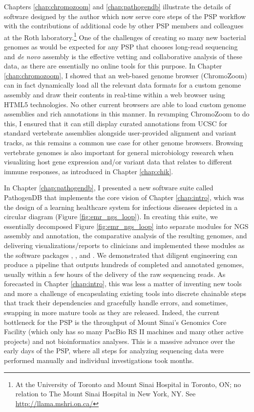 Chapters \ref{chap:chromozoom} and \ref{chap:pathogendb} illustrate the details of software designed by the author which now serve core steps of the PSP workflow with the contributions of additional code by other PSP members and colleagues at the Roth laboratory.\footnote{At the University of Toronto and Mount Sinai Hospital in Toronto, ON; no relation to The Mount Sinai Hospital in New York, NY. See \url{http://llama.mshri.on.ca/}} One of the challenges of creating so many new bacterial genomes as would be expected for any PSP that chooses long-read sequencing and \emph{de novo} assembly is the effective vetting and collaborative analysis of these data, as there are essentially no online tools for this purpose. In Chapter \ref{chap:chromozoom}, I showed that an web-based genome browser (ChromoZoom) can in fact dynamically load all the relevant data formats for a custom genome assembly and draw their contents in real-time within a web browser using HTML5 technologies. No other current browsers are able to load custom genome assemblies and rich annotations in this manner. In revamping ChromoZoom to do this, I ensured that it can still display curated annotations from UCSC for standard vertebrate assemblies alongside user-provided alignment and variant tracks, as this remains a common use case for other genome browsers. Browsing vertebrate genomes is also important for general microbiology research when visualizing host gene expression and/or variant data that relates to different immune responses, as introduced in Chapter \ref{chap:chik}.

In Chapter \ref{chap:pathogendb}, I presented a new software suite called PathogenDB that implements the core vision of Chapter \ref{chap:intro}, which was the design of a learning healthcare system for infectious diseases depicted in a circular diagram (Figure \ref{fig:emr_ngs_loop}). In creating this suite, we essentially decomposed Figure \ref{fig:emr_ngs_loop} into separate modules for NGS assembly and annotation, the comparative analysis of the resulting genomes, and delivering visualizations/reports to clinicians and implemented these modules as the software packages \pathogendbpipeline, \pathogendbcomparison, and \pathogendbviz. We demonstrated that diligent engineering can produce a pipeline that outputs hundreds of completed and annotated genomes, usually within a few hours of the delivery of the raw sequencing reads. As forecasted in Chapter \ref{chap:intro}, this was less a matter of inventing new tools and more a challenge of encapsulating existing tools into discrete chainable steps that track their dependencies and gracefully handle errors, and sometimes, swapping in more mature tools as they are released.\autocite{Seemann2014,Hunt2015} Indeed, the current bottleneck for the PSP is the throughput of Mount Sinai's Genomics Core Facility (which only has so many PacBio RS II machines and many other active projects) and not bioinformatics analyses. This is a massive advance over the early days of the PSP, where all steps for analyzing sequencing data were performed manually and individual investigations took months.

